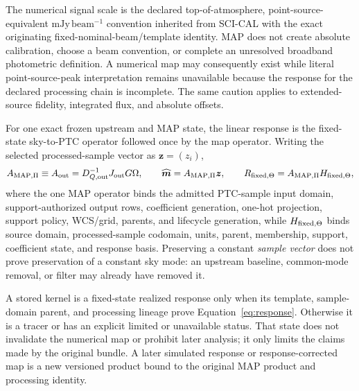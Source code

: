 \documentclass[10pt]{article}
\newcommand{\mjybeam}{\mathrm{mJy\,beam^{-1}}}
\begin{document}
The numerical signal scale is the declared top-of-atmosphere,
point-source-equivalent \(\mjybeam\) convention inherited from SCI-CAL with
the exact originating fixed-nominal-beam/template identity. MAP does not create absolute
calibration, choose a beam convention, or complete an unresolved broadband
photometric definition. A numerical map may consequently exist while literal
point-source-peak interpretation remains unavailable because the response for
the declared processing chain is incomplete. The same caution applies to
extended-source fidelity, integrated flux, and absolute offsets.

For one exact frozen upstream and MAP state, the linear response is the
fixed-state sky-to-PTC operator followed once by the map operator. Writing the
selected processed-sample vector as \(\boldsymbol z=(z_i)\),
\begin{equation}
 A_{{\rm MAP},\Pi}\equiv A_{\rm out}
 =D_{Q,{\rm out}}^{-1}J_{\rm out}G\Omega,\qquad
 \widehat{\boldsymbol m}=A_{{\rm MAP},\Pi}\boldsymbol z,\qquad
 R_{{\rm fixed},\Theta}=A_{{\rm MAP},\Pi}H_{{\rm fixed},\Theta},
 \label{eq:response}
\end{equation}
where the one MAP operator binds the admitted PTC-sample input domain,
support-authorized output rows, coefficient generation, one-hot projection,
support policy, WCS/grid, parents, and lifecycle generation, while
\(H_{{\rm fixed},\Theta}\) binds source domain, processed-sample
codomain, units, parent, membership, support, coefficient state, and response
basis. Preserving a constant \emph{sample vector}
does not prove preservation of a constant sky mode: an upstream baseline,
common-mode removal, or filter may already have removed it.

A stored kernel is a fixed-state realized response only when its template,
sample-domain parent, and processing lineage prove Equation~\eqref{eq:response}.
Otherwise it is a tracer or has an explicit limited or unavailable status.
That state does not invalidate the numerical map or prohibit later analysis;
it only limits the claims made by the original bundle. A later simulated
response or response-corrected map is a new versioned product bound to the
original MAP product and processing identity.
\end{document}
